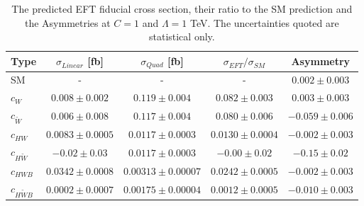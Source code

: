 \documentclass[a4paper,12pt]{article}
\begin{document}
			\begin{table}[ht!]
				\centering
				\renewcommand{\arraystretch}{1.2}
				\begin{tabularx}{\textwidth}{l c c c c} 
				\hline\hline
				Type  		& $\sigma_{Linear}$ [fb] 				& $\sigma_{Quad}$ [fb]  		& $\sigma_{EFT}/\sigma_{SM}$		& Asymmetry \\
				\hline
				SM					& -						 		& - 			  				& -									& $0.002\pm 0.003$\\
				\hline
				$c_W$               &  $0.008\pm0.002$			 	& $0.119\pm0.004$				& $0.082\pm0.003$					& $0.003\pm0.003$\\
				$c_{\tilde{W}}$     &  $0.006\pm0.008$				& $0.117\pm0.004$				& $0.080\pm0.006$					& $-0.059\pm0.006$\\
				\hline
				$c_{HW}$            &  $0.0083\pm0.0005$			& $0.0117\pm0.0003$				& $0.0130\pm0.0004$					& $-0.002\pm0.003$\\
				$c_{H\tilde{W}}$    &  $-0.02\pm0.03$ 				& $0.0117\pm0.0003$				& $-0.00\pm0.02$					& $-0.15\pm0.02$\\
				\hline
				$c_{HWB}$           &  $0.0342\pm0.0008$ 		 	& $0.00313\pm0.00007$			& $0.0242\pm0.0005$					& $-0.002\pm0.003$\\
				$c_{H\tilde{W}B}$   &  $0.0002\pm0.0007$ 			& $0.00175\pm0.00004$			& $0.0012\pm0.0005$					& $-0.010\pm0.003$\\           
				\hline\hline
				\end{tabularx}
				\caption{The predicted EFT fiducial cross section, their ratio to the SM prediction and the Asymmetries at $C=1$ and $\Lambda=1$ TeV. The uncertainties
				quoted are statistical only.}
				\label{tab:EFTeff}
			\end{table}
\end{document}

